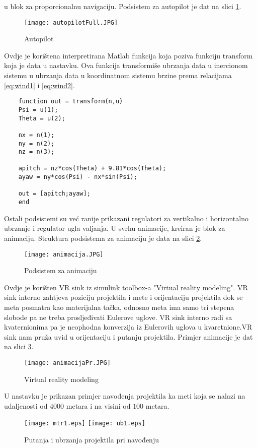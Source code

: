 u blok za proporcionalnu navigaciju. 
Podsistem za autopilot je dat na slici \ref{fig:autopilotFull}. 
\begin{figure}[!ht]
    \centering
    \texttt{[image: autopilotFull.JPG]}
    \caption{Autopilot}
    \label{fig:autopilotFull}
\end{figure}
Ovdje je korištena interpretirana Matlab funkcija koja poziva 
funkciju transform koja je data u nastavku. Ova funkcija transformiše 
ubrzanja data u inercionom sistemu u ubrzanja data u koordinatnom sistemu brzine 
prema relacijama \ref{eq:wind1} i \ref{eq:wind2}.
\begin{lstlisting}
    function out = transform(n,u)
    Psi = u(1);
    Theta = u(2);
    
    nx = n(1);
    ny = n(2);
    nz = n(3);
    
    apitch = nz*cos(Theta) + 9.81*cos(Theta);
    ayaw = ny*cos(Psi) - nx*sin(Psi);
    
    out = [apitch;ayaw];
    end
\end{lstlisting}
Ostali podsistemi su već ranije prikazani regulatori za vertikalno i horizontalno ubrzanje 
i regulator ugla valjanja. 
U svrhu animacije, kreiran je blok za animaciju. Struktura podsistema za animaciju je data na 
slici \ref{fig:animacija}.
\begin{figure}
    \centering
    \texttt{[image: animacija.JPG]}
    \caption{Podsistem za animaciju}
    \label{fig:animacija}
\end{figure}
Ovdje je korišten VR sink iz simulink toolbox-a "Virtual reality modeling". 
VR sink interno zahtjeva poziciju projektila i mete i orijentaciju projektila dok se 
meta posmatra kao materijalna tačka, odnosno meta ima samo tri stepena slobode pa ne treba 
prosljeđivati Eulerove uglove. VR sink interno radi sa kvaternionima pa je neophodna konverzija 
iz Eulerovih uglova u kvaretnione.VR sink nam pruža uvid u orijentaciju i 
putanju projektila. Primjer animacije je dat na slici \ref{fig:prAnimacija}.
\begin{figure}
    \centering
    \texttt{[image: animacijaPr.JPG]}
    \caption{Virtual reality modeling}
    \label{fig:prAnimacija}
\end{figure}
U nastavku je prikazan primjer navođenja projektila ka meti koja se nalazi na udaljenosti 
od $4000$ metara i na visini od $100$ metara. 
\begin{figure}[!ht]
    \centering
    \texttt{[image: mtr1.eps]}
    \texttt{[image: ub1.eps]}
    \caption{Putanja i ubrzanja projektila pri navođenju}
    \label{fig:ub1}
\end{figure}
